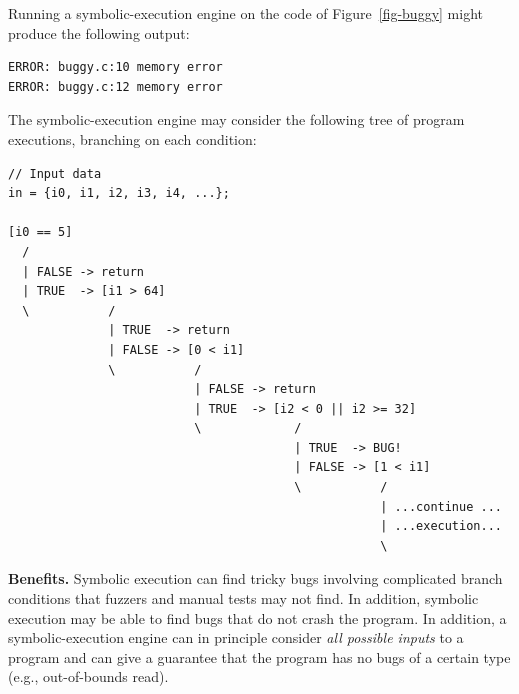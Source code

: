 \documentclass[
  letterpaper,
]{scrbook}
\theoremstyle{definition}
\theoremstyle{plain}
\theoremstyle{plain}
\theoremstyle{remark}
\begin{document}

Running a symbolic-execution engine on the code of
Figure~\ref{fig-buggy} might produce the following output:

\begin{verbatim}
ERROR: buggy.c:10 memory error
ERROR: buggy.c:12 memory error
\end{verbatim}

The symbolic-execution engine may consider the following tree of program
executions, branching on each condition:

\begin{verbatim}
// Input data
in = {i0, i1, i2, i3, i4, ...};

[i0 == 5]
  /
  | FALSE -> return
  | TRUE  -> [i1 > 64]
  \           /
              | TRUE  -> return
              | FALSE -> [0 < i1]
              \           /
                          | FALSE -> return
                          | TRUE  -> [i2 < 0 || i2 >= 32]
                          \             /
                                        | TRUE  -> BUG!
                                        | FALSE -> [1 < i1]
                                        \           /
                                                    | ...continue ...
                                                    | ...execution...
                                                    \
\end{verbatim}

\textbf{Benefits.} Symbolic execution can find tricky bugs involving
complicated branch conditions that fuzzers and manual tests may not
find. In addition, symbolic execution may be able to find bugs that do
not crash the program. In addition, a symbolic-execution engine can in
principle consider \emph{all possible inputs} to a program and can give
a guarantee that the program has no bugs of a certain type (e.g.,
out-of-bounds read).
\end{document}
